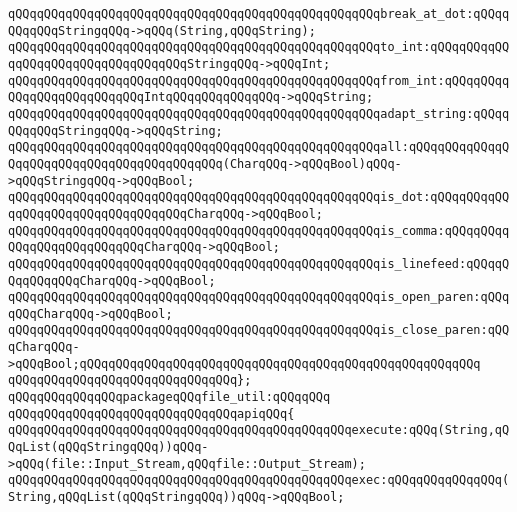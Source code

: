 \verb|qQQqqQQqqQQqqQQqqQQqqQQqqQQqqQQqqQQqqQQqqQQqqQQqqQQqbreak_at_dot:qQQqqQQqqQQqStringqQQq->qQQq(String,qQQqString);|\newline
\verb|qQQqqQQqqQQqqQQqqQQqqQQqqQQqqQQqqQQqqQQqqQQqqQQqqQQqto_int:qQQqqQQqqQQqqQQqqQQqqQQqqQQqqQQqqQQqStringqQQq->qQQqInt;|\newline
\verb|qQQqqQQqqQQqqQQqqQQqqQQqqQQqqQQqqQQqqQQqqQQqqQQqqQQqfrom_int:qQQqqQQqqQQqqQQqqQQqqQQqqQQqIntqQQqqQQqqQQqqQQq->qQQqString;|\newline
\verb|qQQqqQQqqQQqqQQqqQQqqQQqqQQqqQQqqQQqqQQqqQQqqQQqqQQqadapt_string:qQQqqQQqqQQqStringqQQq->qQQqString;|\newline
\newline
\verb|qQQqqQQqqQQqqQQqqQQqqQQqqQQqqQQqqQQqqQQqqQQqqQQqqQQqall:qQQqqQQqqQQqqQQqqQQqqQQqqQQqqQQqqQQqqQQqqQQq(CharqQQq->qQQqBool)qQQq->qQQqStringqQQq->qQQqBool;|\newline
\newline
\verb|qQQqqQQqqQQqqQQqqQQqqQQqqQQqqQQqqQQqqQQqqQQqqQQqqQQqis_dot:qQQqqQQqqQQqqQQqqQQqqQQqqQQqqQQqqQQqCharqQQq->qQQqBool;|\newline
\verb|qQQqqQQqqQQqqQQqqQQqqQQqqQQqqQQqqQQqqQQqqQQqqQQqqQQqis_comma:qQQqqQQqqQQqqQQqqQQqqQQqqQQqCharqQQq->qQQqBool;|\newline
\verb|qQQqqQQqqQQqqQQqqQQqqQQqqQQqqQQqqQQqqQQqqQQqqQQqqQQqis_linefeed:qQQqqQQqqQQqqQQqCharqQQq->qQQqBool;|\newline
\verb|qQQqqQQqqQQqqQQqqQQqqQQqqQQqqQQqqQQqqQQqqQQqqQQqqQQqis_open_paren:qQQqqQQqCharqQQq->qQQqBool;|\newline
\verb|qQQqqQQqqQQqqQQqqQQqqQQqqQQqqQQqqQQqqQQqqQQqqQQqqQQqis_close_paren:qQQqCharqQQq->qQQqBool;qQQqqQQqqQQqqQQqqQQqqQQqqQQqqQQqqQQqqQQqqQQqqQQqqQQqqQQq|\newline
\verb|qQQqqQQqqQQqqQQqqQQqqQQqqQQqqQQq};|\newline
\newline
\newline
\verb|qQQqqQQqqQQqqQQqpackageqQQqfile_util:qQQqqQQq|\newline
\verb|qQQqqQQqqQQqqQQqqQQqqQQqqQQqqQQqapiqQQq{|\newline
\verb|qQQqqQQqqQQqqQQqqQQqqQQqqQQqqQQqqQQqqQQqqQQqqQQqexecute:qQQq(String,qQQqList(qQQqStringqQQq))qQQq->qQQq(file::Input_Stream,qQQqfile::Output_Stream);|\newline
\verb|qQQqqQQqqQQqqQQqqQQqqQQqqQQqqQQqqQQqqQQqqQQqqQQqexec:qQQqqQQqqQQqqQQq(String,qQQqList(qQQqStringqQQq))qQQq->qQQqBool;|\newline
\newline

